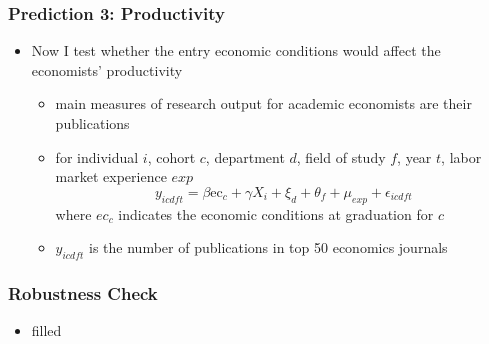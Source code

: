 \documentclass[11pt]{beamer}
\begin{document}
\begin{frame}
	\frametitle{Prediction 3: Productivity}
	\begin{itemize}
		\item Now I test whether the entry economic conditions would affect the economists' productivity
		\begin{itemize}
			\item main measures of research output for academic economists are their publications
			\item for individual $i$, cohort $c$,  department $d$, field of study $f$, year $t$, labor market experience $exp$
				\begin{equation}
				\label{eq:eq3}
					y_{icdft} = \beta \text{ec}_{c}+\gamma X_{i}+\xi_{d}+\theta_f +\mu_{exp}  +\epsilon_{icdft}
				\end{equation}
				where $ec_c$ indicates the economic conditions at graduation for $c$
				\item $y_{icdft}$ is the number of publications in top 50 economics journals 
			\end{itemize}
	\end{itemize}
\end{frame}




\begin{frame}
	\frametitle{Robustness Check}
	\begin{itemize}
	\item filled
	\end{itemize}
\end{frame}
\end{document}
